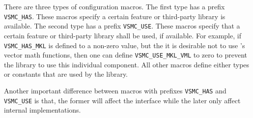 There are three types of configuration macros. The first type has a prefix
\verb|VSMC_HAS|. These macros specify a certain feature or third-party library
is available. The second type has a prefix \verb|VSMC_USE|. These macros
specify that a certain feature or third-party library shall be used, if
available. For example, if \verb|VSMC_HAS_MKL| is defined to a non-zero value,
but the it is desirable not to use \mkl's vector math functions, then one can
define \verb|VSMC_USE_MKL_VML| to zero to prevent the library to use this
individual component. All other macros define either types or constants that
are used by the library.

Another important difference between macros with prefixes \verb|VSMC_HAS| and
\verb|VSMC_USE| is that, the former will affect the interface while the later
only affect internal implementations.

